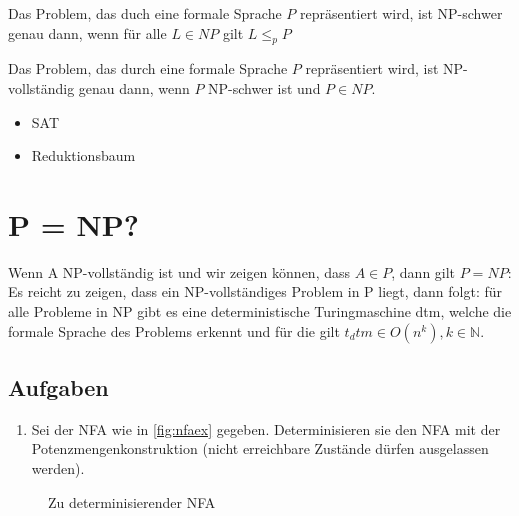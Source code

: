 Das Problem, das duch eine formale Sprache $P$ repräsentiert wird, ist NP-schwer
genau dann, wenn für alle $L \in NP$ gilt $L \leq_p P$

Das Problem, das durch eine formale Sprache $P$ repräsentiert wird, ist NP-vollständig
genau dann, wenn $P$ NP-schwer ist und $P \in NP$.

\begin{itemize}
    \item SAT
    \item Reduktionsbaum
\end{itemize}

\section{P = NP?}

Wenn A NP-vollständig ist und wir zeigen können, dass $A \in P$, dann gilt $P = NP$:
Es reicht zu zeigen, dass ein NP-vollständiges Problem in P liegt,
dann folgt: für alle Probleme in NP gibt es eine deterministische Turingmaschine dtm,
welche die formale Sprache des Problems erkennt und für die gilt $t_dtm \in O(n^k), k \in \mathbb{N}$.


\subsection*{Aufgaben}
\begin{enumerate}
    \item Sei der NFA wie in \autoref{fig:nfaex} gegeben.
        Determinisieren sie den NFA mit der Potenzmengenkonstruktion (nicht erreichbare Zustände dürfen ausgelassen werden).
\end{enumerate}

\begin{figure}[ht] %
\centering %
\caption{Zu determinisierender NFA}\label{fig:nfaex}
\end{figure}

